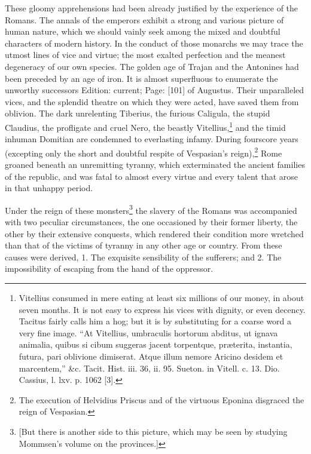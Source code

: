These gloomy apprehensions had been already justified by the experience of the Romans. The annals of the emperors exhibit a strong and various picture of human nature, which we should vainly seek among the mixed and doubtful characters of modern history. In the conduct of those monarchs we may trace the utmost lines of vice and virtue; the most exalted perfection and the meanest degeneracy of our own species. The golden age of Trajan and the Antonines had been preceded by an age of iron. It is almost superfluous to enumerate the unworthy successors Edition: current; Page: [101] of Augustus. Their unparalleled vices, and the splendid theatre on which they were acted, have saved them from oblivion. The dark unrelenting Tiberius, the furious Caligula, the stupid Claudius, the profligate and cruel Nero, the beastly Vitellius,\footnote{Vitellius consumed in mere eating at least six millions of our money, in about seven months. It is not easy to express his vices with dignity, or even decency. Tacitus fairly calls him a hog; but it is by substituting for a coarse word a very fine image. \texthebrew{“}At Vitellius, umbraculis hortorum abditus, ut ignava animalia, quibus si cibum suggeras jacent torpentque, præterita, instantia, futura, pari oblivione dimiserat. Atque illum nemore Aricino desidem et marcentem,\texthebrew{}” \&c. Tacit. Hist. iii. 36, ii. 95. Sueton. in Vitell. c. 13. Dio. Cassius, l. lxv. p. 1062 [3].} and the timid inhuman Domitian are condemned to everlasting infamy. During fourscore years (excepting only the short and doubtful respite of Vespasian\texthebrew{}’s reign),\footnote{The execution of Helvidius Priscus and of the virtuous Eponina disgraced the reign of Vespasian.} Rome groaned beneath an unremitting tyranny, which exterminated the ancient families of the republic, and was fatal to almost every virtue and every talent that arose in that unhappy period.

Under the reign of these monsters\footnote{[But there is another side to this picture, which may be seen by studying Mommsen\texthebrew{}’s volume on the provinces.]} the slavery of the Romans was accompanied with two peculiar circumstances, the one occasioned by their former liberty, the other by their extensive conquests, which rendered their condition more wretched than that of the victims of tyranny in any other age or country. From these causes were derived, 1. The exquisite sensibility of the sufferers; and 2. The impossibility of escaping from the hand of the oppressor.

